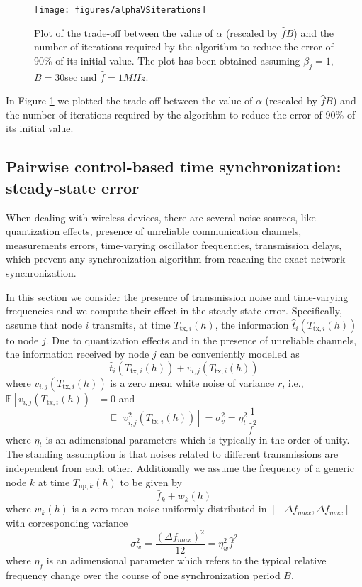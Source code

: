 \documentclass[english,a4paper,10pt,final]{article}
\numberwithin{equation}{section}
\numberwithin{figure}{section}
\begin{document}
\begin{figure} 
\center

\texttt{[image: figures/alphaVSiterations]} 

\caption{\label{fig:alphaVSiterations} Plot of the trade-off between the value of $\alpha$ (rescaled by $\hat f B$) and the number of iterations required by the algorithm to reduce the error of 90\% of its initial value. The plot has been obtained assuming $\beta_j=1$, $B=30$sec and $\hat f =1MHz$.}
\end{figure}

In Figure \ref{fig:alphaVSiterations} we plotted the trade-off between the value of $\alpha$ (rescaled by $\hat f B$) and the number of iterations required by the algorithm to reduce the error of 90\% of its initial value. 


\subsection{Pairwise control-based time synchronization: steady-state error}
\label{sec:noise2}

When dealing with wireless devices, there are several noise sources, like quantization effects, presence of unreliable communication channels, measurements errors, time-varying oscillator frequencies, transmission delays, which prevent any synchronization algorithm from reaching the exact network synchronization. 

In this section we consider the presence of transmission noise and time-varying frequencies and we compute their effect in the steady state error. Specifically, assume that node $i$ transmits, at time $T_{\mathrm{tx},i}(h)$, the information $\hat{t}_i(T_{\mathrm{tx},i}(h))$ to node $j$. Due to quantization effects and in the presence of unreliable channels, 
the information received by node $j$ can be conveniently modelled as
$$
\hat{t}_i(T_{\mathrm{tx},i}(h))+v_{i,j}(T_{\mathrm{tx},i}(h))
$$
where $v_{i,j}(T_{\mathrm{tx},i}(h))$ is a zero mean white noise of variance $r$, i.e.,$\mathbb{E}\left[v_{i,j}(T_{\mathrm{tx},i}(h))\right]=0$ and $$\mathbb{E}\left[v^2_{i,j}(T_{\mathrm{tx},i}(h))\right]=\sigma_v^2=\eta^2_t \frac{1}{\hat f^2}$$
where $\eta_t$ is an adimensional parameters which is typically in the order of unity.
The standing assumption is that noises related to different transmissions are independent from each other.  Additionally we assume the frequency of a generic node $k$ at time $T_{\mathrm{up},k}(h)$ to be given by 
$$
\bar{f}_k+w_k(h)
$$
where $w_k(h)$ is a zero mean-noise uniformly distributed in $\left[-\Delta f_{max}, \Delta f_{max}\right]$ with corresponding variance $$\sigma_w^2=\frac{(\Delta f_{max})^2}{12}= \eta_w^2 \hat f^2$$
where $ \eta_f$ is an adimensional parameter which refers to the typical relative frequency change over the course of one synchronization period $B$.
\end{document}

